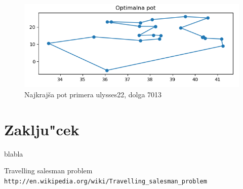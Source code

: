 \documentclass[12pt,a4paper]{amsart}
\theoremstyle{definition} %
\theoremstyle{plain} %
\begin{document}
\begin{figure}[h]
\caption{Najkrajša pot primera ulysses22, dolga 7013}
\centering
\includegraphics[scale =0.5]{ulysses22_7013}
\end{figure}

\section{Zaklju"cek}
blabla

\pagebreak
\begin{thebibliography}{99}

Travelling salesman problem
\\\texttt{http://en.wikipedia.org/wiki/Travelling\_salesman\_problem}


\end{thebibliography}
\end{document}
